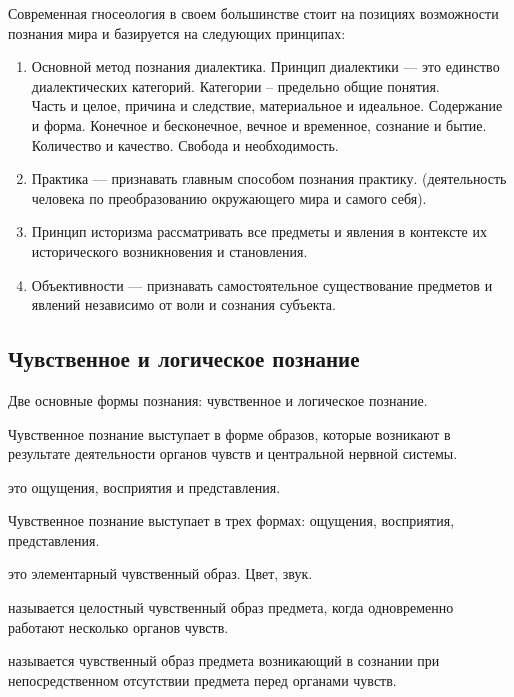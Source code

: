 \documentclass[
]{article}
\providecommand{\tightlist}{%
  \setlength{\itemsep}{0pt}\setlength{\parskip}{0pt}}
\begin{document}
Современная гносеология в своем большинстве стоит на позициях
возможности познания мира и базируется на следующих принципах:

\begin{enumerate}
\def\labelenumi{\arabic{enumi}.}
\tightlist
\item
  Основной метод познания диалектика. Принцип диалектики --- это
  единство диалектических категорий. Категории -- предельно общие
  понятия.\\
  Часть и целое, причина и следствие, материальное и идеальное.
  Содержание и форма. Конечное и бесконечное, вечное и временное,
  сознание и бытие. Количество и качество. Свобода и необходимость.
\item
  Практика --- признавать главным способом познания практику.
  (деятельность человека по преобразованию окружающего мира и самого
  себя).
\item
  Принцип историзма рассматривать все предметы и явления в контексте их
  исторического возникновения и становления.
\item
  Объективности --- признавать самостоятельное существование предметов и
  явлений независимо от воли и сознания субъекта.
\end{enumerate}

\hypertarget{ux447ux443ux432ux441ux442ux432ux435ux43dux43dux43eux435-ux438-ux43bux43eux433ux438ux447ux435ux441ux43aux43eux435-ux43fux43eux437ux43dux430ux43dux438ux435}{%
\subsection{Чувственное и логическое
познание}\label{ux447ux443ux432ux441ux442ux432ux435ux43dux43dux43eux435-ux438-ux43bux43eux433ux438ux447ux435ux441ux43aux43eux435-ux43fux43eux437ux43dux430ux43dux438ux435}}

Две основные формы познания: чувственное и логическое познание.

Чувственное познание выступает в форме образов, которые возникают в
результате деятельности органов чувств и центральной нервной системы.

\begin{description}
\tightlist
\item[\textbf{Образы ---}]
это ощущения, восприятия и представления.
\end{description}

Чувственное познание выступает в трех формах: ощущения, восприятия,
представления.

\begin{description}
\tightlist
\item[\textbf{Ощущение ---}]
это элементарный чувственный образ. Цвет, звук.
\item[\textbf{Восприятием}]
называется целостный чувственный образ предмета, когда одновременно
работают несколько органов чувств.
\item[\textbf{Представлением}]
называется чувственный образ предмета возникающий в сознании при
непосредственном отсутствии предмета перед органами чувств.
\end{description}
\end{document}

